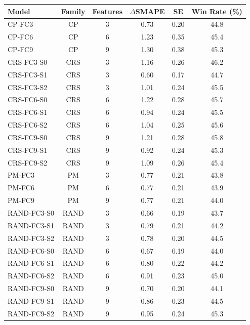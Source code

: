 \begin{tabular}{|l|c|c|c|c|c|}
\hline
Model & Family & Features & $\Delta$SMAPE & SE & Win Rate (\%) \\
\hline
CP-FC3 & CP & 3 & 0.73 & 0.20 & 44.8 \\
CP-FC6 & CP & 6 & 1.23 & 0.35 & 45.4 \\
CP-FC9 & CP & 9 & 1.30 & 0.38 & 45.3 \\
CRS-FC3-S0 & CRS & 3 & 1.16 & 0.26 & 46.2 \\
CRS-FC3-S1 & CRS & 3 & 0.60 & 0.17 & 44.7 \\
CRS-FC3-S2 & CRS & 3 & 1.01 & 0.24 & 45.5 \\
CRS-FC6-S0 & CRS & 6 & 1.22 & 0.28 & 45.7 \\
CRS-FC6-S1 & CRS & 6 & 0.94 & 0.24 & 45.5 \\
CRS-FC6-S2 & CRS & 6 & 1.04 & 0.25 & 45.6 \\
CRS-FC9-S0 & CRS & 9 & 1.21 & 0.28 & 45.8 \\
CRS-FC9-S1 & CRS & 9 & 0.92 & 0.24 & 45.3 \\
CRS-FC9-S2 & CRS & 9 & 1.09 & 0.26 & 45.4 \\
PM-FC3 & PM & 3 & 0.77 & 0.21 & 43.8 \\
PM-FC6 & PM & 6 & 0.77 & 0.21 & 43.9 \\
PM-FC9 & PM & 9 & 0.77 & 0.21 & 44.0 \\
RAND-FC3-S0 & RAND & 3 & 0.66 & 0.19 & 43.7 \\
RAND-FC3-S1 & RAND & 3 & 0.79 & 0.21 & 44.2 \\
RAND-FC3-S2 & RAND & 3 & 0.78 & 0.20 & 44.5 \\
RAND-FC6-S0 & RAND & 6 & 0.67 & 0.19 & 44.0 \\
RAND-FC6-S1 & RAND & 6 & 0.80 & 0.22 & 44.2 \\
RAND-FC6-S2 & RAND & 6 & 0.91 & 0.23 & 45.0 \\
RAND-FC9-S0 & RAND & 9 & 0.70 & 0.20 & 44.1 \\
RAND-FC9-S1 & RAND & 9 & 0.86 & 0.23 & 44.5 \\
RAND-FC9-S2 & RAND & 9 & 0.95 & 0.24 & 45.3 \\
\hline
\end{tabular}